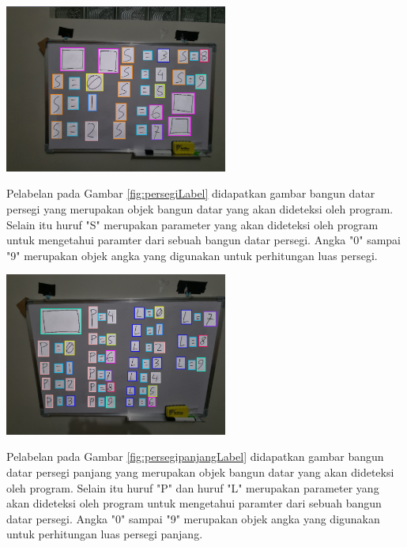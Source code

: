 \begin{center}
	\includegraphics[width=0.55\textwidth]{gambar/Persegi Label.png}	
	\label{fig:persegiLabel}
\end{center}
Pelabelan pada Gambar \ref{fig:persegiLabel} didapatkan gambar bangun datar persegi yang merupakan objek bangun datar yang akan dideteksi oleh program. Selain itu huruf "S" merupakan parameter yang akan dideteksi oleh program untuk mengetahui paramter dari sebuah bangun datar persegi. Angka "0" sampai "9" merupakan objek angka yang digunakan untuk perhitungan luas persegi.

\begin{center}
	\includegraphics[width=0.55\textwidth]{gambar/Persegi Panjang Label.png}	
	\label{fig:persegipanjangLabel}
\end{center}
Pelabelan pada Gambar \ref{fig:persegipanjangLabel} didapatkan gambar bangun datar persegi panjang yang merupakan objek bangun datar yang akan dideteksi oleh program. Selain itu huruf "P" dan huruf "L" merupakan parameter yang akan dideteksi oleh program untuk mengetahui paramter dari sebuah bangun datar persegi. Angka "0" sampai "9" merupakan objek angka yang digunakan untuk perhitungan luas persegi panjang.

